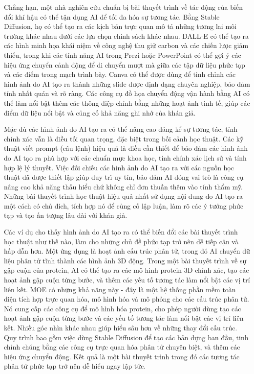 Chẳng hạn, một nhà nghiên cứu chuẩn bị bài thuyết trình về tác động của biến đổi khí hậu có thể tận dụng AI để tối đa hóa sự tương tác. Bằng Stable Diffusion, họ có thể tạo ra các kịch bản trực quan mô tả những tương lai môi trường khác nhau dưới các lựa chọn chính sách khác nhau. DALL-E có thể tạo ra các hình minh họa khái niệm về công nghệ thu giữ carbon và các chiến lược giảm thiểu, trong khi các tính năng AI trong Prezi hoặc PowerPoint có thể gợi ý các hiệu ứng chuyển cảnh động để di chuyển mượt mà giữa các tập dữ liệu phức tạp và các điểm trong mạch trình bày. Canva có thể được dùng để tinh chỉnh các hình ảnh do AI tạo ra thành những slide được định dạng chuyên nghiệp, bảo đảm tính nhất quán và rõ ràng. Các công cụ đồ họa chuyển động vận hành bằng AI có thể làm nổi bật thêm các thông điệp chính bằng những hoạt ảnh tinh tế, giúp các điểm dữ liệu nổi bật và củng cố khả năng ghi nhớ của khán giả.

Mặc dù các hình ảnh do AI tạo ra có thể nâng cao đáng kể sự tương tác, tính chính xác vẫn là điều tối quan trọng, đặc biệt trong bối cảnh học thuật. Các kỹ thuật viết prompt (câu lệnh) hiệu quả là điều cần thiết để bảo đảm các hình ảnh do AI tạo ra phù hợp với các chuẩn mực khoa học, tính chính xác lịch sử và tính hợp lệ lý thuyết. Việc đối chiếu các hình ảnh do AI tạo ra với các nguồn học thuật đã được thiết lập giúp duy trì uy tín, bảo đảm AI đóng vai trò là công cụ nâng cao khả năng thấu hiểu chứ không chỉ đơn thuần thêm vào tính thẩm mỹ. Những bài thuyết trình học thuật hiệu quả nhất sử dụng nội dung do AI tạo ra một cách có chủ đích, tích hợp nó để củng cố lập luận, làm rõ các ý tưởng phức tạp và tạo ấn tượng lâu dài với khán giả.

Các ví dụ cho thấy hình ảnh do AI tạo ra có thể biến đổi các bài thuyết trình học thuật như thế nào, làm cho những chủ đề phức tạp trở nên dễ tiếp cận và hấp dẫn hơn. Một ứng dụng là hoạt ảnh cấu trúc phân tử, trong đó AI chuyển dữ liệu phân tử tĩnh thành các hình ảnh 3D động. Trong một bài thuyết trình về sự gập cuộn của protein, AI có thể tạo ra các mô hình protein 3D chính xác, tạo các hoạt ảnh gập cuộn từng bước, và thêm các yếu tố tương tác làm nổi bật các vị trí liên kết. MOE có những khả năng này - đây là một hệ thống phần mềm toàn diện tích hợp trực quan hóa, mô hình hóa và mô phỏng cho các cấu trúc phân tử. Nó cung cấp các công cụ để mô hình hóa protein, cho phép người dùng tạo các hoạt ảnh gập cuộn từng bước và các yếu tố tương tác làm nổi bật các vị trí liên kết. Nhiều góc nhìn khác nhau giúp hiểu sâu hơn về những thay đổi cấu trúc. Quy trình bao gồm việc dùng Stable Diffusion để tạo các bản dựng ban đầu, tinh chỉnh chúng bằng các công cụ trực quan hóa phân tử chuyên biệt, và thêm các hiệu ứng chuyển động. Kết quả là một bài thuyết trình trong đó các tương tác phân tử phức tạp trở nên dễ hiểu ngay lập tức.

